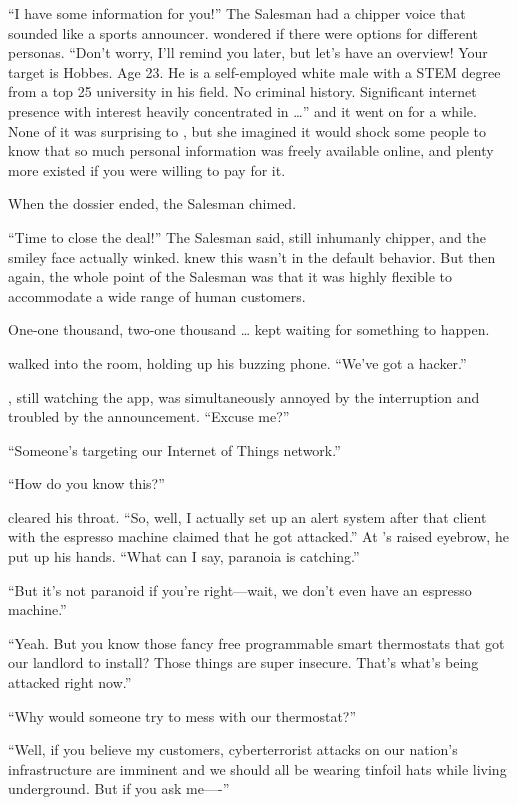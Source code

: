 ``I have some information for you!'' The Salesman had a chipper voice that sounded like a sports announcer. {\protag} wondered if there were options for different personas. ``Don't worry, I'll remind you later, but let's have an overview! Your target is {\sidetag} Hobbes. Age 23. He is a self-employed white male with a STEM degree from a top 25 university in his field. No criminal history. Significant internet presence with interest heavily concentrated in \dots'' and it went on for a while. None of it was surprising to {\protag}, but she imagined it would shock some people to know that so much personal information was freely available online, and plenty more existed if you were willing to pay for it.

When the dossier ended, the Salesman chimed.

``Time to close the deal!'' The Salesman said, still inhumanly chipper, and the smiley face actually winked. {\protag} knew this wasn't in the default behavior. But then again, the whole point of the Salesman was that it was highly flexible to accommodate a wide range of human customers.

One-one thousand, two-one thousand \dots {\protag} kept waiting for something to happen.

{\sidetag} walked into the room, holding up his buzzing phone. ``We've got a hacker.''

{\protag}, still watching the app, was simultaneously annoyed by the interruption and troubled by the announcement. ``Excuse me?''

``Someone's targeting our Internet of Things network.''

``How do you know this?''

{\sidetag} cleared his throat. ``So, well, I actually set up an alert system after that client with the espresso machine claimed that he got attacked.'' At {\protag}'s raised eyebrow, he put up his hands. ``What can I say, paranoia is catching.''

``But it's not paranoid if you're right---wait, we don't even have an espresso machine.''

``Yeah. But you know those fancy free programmable smart thermostats that \crunchyCity{} got our landlord to install? Those things are super insecure. That's what's being attacked right now.''

``Why would someone try to mess with our thermostat?''

``Well, if you believe my customers, cyberterrorist attacks on our nation's infrastructure are imminent and we should all be wearing tinfoil hats while living underground. But if you ask me----''

